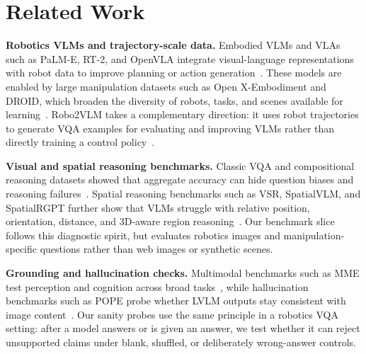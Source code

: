 \section{Related Work}
\label{sec:related}

\textbf{Robotics VLMs and trajectory-scale data.}
Embodied VLMs and VLAs such as PaLM-E, RT-2, and OpenVLA integrate visual-language representations with robot data to improve planning or action generation~\cite{driess2023palme,brohan2023rt2,kim2024openvla}. These models are enabled by large manipulation datasets such as Open X-Embodiment and DROID, which broaden the diversity of robots, tasks, and scenes available for learning~\cite{oneill2023openx,khazatsky2024droid}. Robo2VLM takes a complementary direction: it uses robot trajectories to generate VQA examples for evaluating and improving VLMs rather than directly training a control policy~\cite{chen2025robo2vlm}.

\textbf{Visual and spatial reasoning benchmarks.}
Classic VQA and compositional reasoning datasets showed that aggregate accuracy can hide question biases and reasoning failures~\cite{johnson2017clevr,hudson2019gqa}. Spatial reasoning benchmarks such as VSR, SpatialVLM, and SpatialRGPT further show that VLMs struggle with relative position, orientation, distance, and 3D-aware region reasoning~\cite{liu2022vsr,chen2024spatialvlm,cheng2024spatialrgpt}. Our benchmark slice follows this diagnostic spirit, but evaluates robotics images and manipulation-specific questions rather than web images or synthetic scenes.

\textbf{Grounding and hallucination checks.}
Multimodal benchmarks such as MME test perception and cognition across broad tasks~\cite{fu2023mme}, while hallucination benchmarks such as POPE probe whether LVLM outputs stay consistent with image content~\cite{li2023pope}. Our sanity probes use the same principle in a robotics VQA setting: after a model answers or is given an answer, we test whether it can reject unsupported claims under blank, shuffled, or deliberately wrong-answer controls.